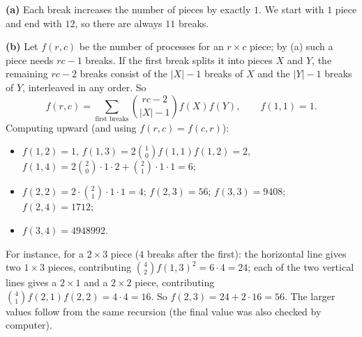 \textbf{(a)} Each break increases the number of pieces by exactly $1$. We start with $1$ piece and end with $12$, so there are always $\boxed{11}$ breaks.

\textbf{(b)} Let $f(r,c)$ be the number of processes for an $r\times c$ piece; by (a) such a piece needs $rc-1$ breaks. If the first break splits it into pieces $X$ and $Y$, the remaining $rc-2$ breaks consist of the $|X|-1$ breaks of $X$ and the $|Y|-1$ breaks of $Y$, interleaved in any order. So
\[
f(r,c)=\sum_{\text{first breaks}}\binom{rc-2}{|X|-1}f(X)f(Y),\qquad f(1,1)=1 .
\]
Computing upward (and using $f(r,c)=f(c,r)$):
\begin{itemize}
\item $f(1,2)=1$, $f(1,3)=2\binom{1}{0}f(1,1)f(1,2)=2$, $f(1,4)=2\binom{2}{0}\cdot1\cdot2+\binom21\cdot1\cdot1=6$;
\item $f(2,2)=2\cdot\binom21\cdot1\cdot1=4$; $f(2,3)=56$; $f(3,3)=9408$; $f(2,4)=1712$;
\item $f(3,4)=\boxed{4948992}$.
\end{itemize}
For instance, for a $2\times3$ piece ($4$ breaks after the first): the horizontal line gives two $1\times3$ pieces, contributing $\binom42f(1,3)^2=6\cdot4=24$; each of the two vertical lines gives a $2\times1$ and a $2\times2$ piece, contributing $\binom41f(2,1)f(2,2)=4\cdot4=16$. So $f(2,3)=24+2\cdot16=56$. The larger values follow from the same recursion (the final value was also checked by computer).
